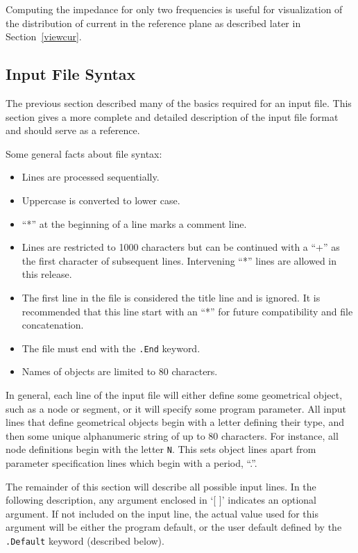 Computing the impedance for only two frequencies is useful for
visualization of the distribution of current in the reference plane 
as described later in Section~\ref{viewcur}.


\subsection{Input File Syntax}
\label{syntax}

The previous section described many of the basics required for an
input file.  This section gives a more complete and detailed description of the
input file format and should serve as a reference.

Some general facts about file syntax:
\begin{itemize}
        \item Lines are processed sequentially.
        \item Uppercase is converted to lower case.
        \item ``*'' at the beginning of a line marks a comment line.
        \item Lines are restricted to 1000 characters but can be
continued with a ``+'' as the first character of subsequent lines.
Intervening ``*'' lines are allowed in this release.
        \item The first line in the file is considered the title line
and is ignored. It is recommended that this line start with an ``*''
for future compatibility and file concatenation.
        \item The file must end with the {\tt .End} keyword.
        \item Names of objects are limited to 80 characters.
\end{itemize}

In general, each line of the input file will either define some
geometrical object, such as a node or segment, or it will specify some
program parameter.  
All input lines that define geometrical objects begin with a letter
defining their type, and then some unique alphanumeric string of up to
80 characters.  For
instance, all node definitions begin with the letter {\tt N}.  
This sets object lines apart
from parameter specification lines which begin with a period, ``.''.

The remainder of this section will describe all
possible input lines.  In the following description, any argument
enclosed in `[ ]' indicates an optional argument.  If not included on
the input line, the actual value used for this argument will be either
the program default, or the user default defined by the {\tt .Default}
keyword (described below). 

